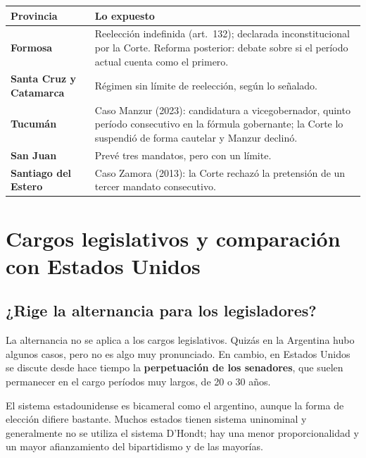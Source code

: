 \documentclass[12pt,oneside]{book}
\begin{document}
\begin{table}[H]
\centering
\begin{tabularx}{\textwidth}{>{\raggedright\arraybackslash}p{} >{\raggedright\arraybackslash}X}
\toprule
\textbf{Provincia} & \textbf{Lo expuesto} \\
\midrule
\textbf{Formosa} & Reelección indefinida (art.~132); declarada inconstitucional por la Corte. Reforma posterior: debate sobre si el período actual cuenta como el primero. \\
\textbf{Santa Cruz y Catamarca} & Régimen sin límite de reelección, según lo señalado. \\
\textbf{Tucumán} & Caso Manzur (2023): candidatura a vicegobernador, quinto período consecutivo en la fórmula gobernante; la Corte lo suspendió de forma cautelar y Manzur declinó. \\
\textbf{San Juan} & Prevé tres mandatos, pero con un límite. \\
\textbf{Santiago del Estero} & Caso Zamora (2013): la Corte rechazó la pretensión de un tercer mandato consecutivo. \\
\bottomrule
\end{tabularx}
\end{table}

\section{Cargos legislativos y comparación con Estados Unidos}

\subsection{¿Rige la alternancia para los legisladores?}

La alternancia no se aplica a los cargos legislativos. Quizás en la Argentina hubo algunos casos, pero no es algo muy pronunciado. En cambio, en Estados Unidos se discute desde hace tiempo la \textbf{perpetuación de los senadores}, que suelen permanecer en el cargo períodos muy largos, de 20 o 30 años.

El sistema estadounidense es bicameral como el argentino, aunque la forma de elección difiere bastante. Muchos estados tienen sistema uninominal y generalmente no se utiliza el sistema D’Hondt; hay una menor proporcionalidad y un mayor afianzamiento del bipartidismo y de las mayorías.
\end{document}
